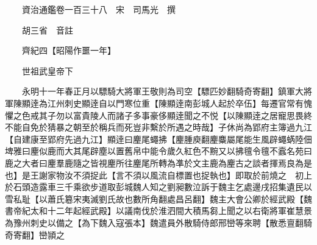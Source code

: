 










 


 
 


 

  
  
  
  
  





  
  
  
  
  
 
  

  

  
  
  



  

 
 

  
   




  

  
  


  　　資治通鑑卷一百三十八　宋　司馬光　撰

　　胡三省　音註

　　齊紀四【昭陽作噩一年】

　　世祖武皇帝下

　　永明十一年春正月以驃騎大將軍王敬則為司空【驃匹妙翻騎奇寄翻】鎮軍大將軍陳顯逹為江州刺史顯逹自以門寒位重【陳顯逹南彭城人起於卒伍】每遷官常有愧懼之色戒其子勿以富貴陵人而諸子多事豪侈顯逹聞之不悦【以陳顯逹之居寵思畏終不能自免於猜暴之朝至於稱兵而死豈非繫於所遇之時哉】子休尚為郢府主簿過九江【自建康至郢府先過九江】顯逹曰麈尾蠅拂【麈腫庾翻麈麋屬尾能生風辟蠅蜹陸佃埤雅曰麈似鹿而大其尾辟塵以置舊帛中能令歲久紅色不黦又以拂氊令氊不蠧名苑曰鹿之大者曰麈羣鹿隨之皆視麈所往麈尾所轉為凖於文主鹿為麈古之談者揮焉良為是也】是王謝家物汝不須捉此【言不須以風流自標置也捉執也】即取於前燒之　初上於石頭造露車三千乘欲步道取彭城魏人知之劉昶數泣訴于魏主乞處邊戌招集遺民以雪私耻【以蕭氏簒宋夷滅劉氏故也數所角翻處昌呂翻】魏主大會公卿於經武殿【魏書帝紀太和十二年起經武殿】以議南伐於淮泗間大積馬芻上聞之以右衛將軍崔慧景為豫州刺史以備之【為下魏入寇張本】魏遣員外散騎侍郎邢巒等來聘【散悉亶翻騎奇寄翻】巒頴之

